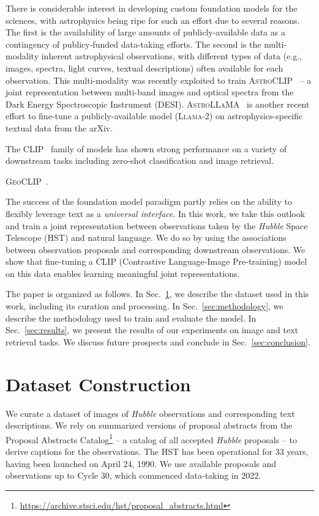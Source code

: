 \documentclass[10pt]{article} %
\newcommand{\hubble}{\emph{Hubble}\xspace}
\begin{document}
There is considerable interest in developing custom foundation models for the sciences, with astrophysics being ripe for such an effort due to several reasons. The first is the availability of large amounts of publicly-available data as a contingency of publicy-funded data-taking efforts. The second is the multi-modality inherent astrophysical observations, with different types of data (e.g., images, spectra, light curves, textual descriptions) often available for each observation. This multi-modality was recently exploited to train \textsc{AstroCLIP}~\citep{lanusse2023astroclip} -- a joint representation between multi-band images and optical spectra from the Dark Energy Spectroscopic Instrument (DESI). \textsc{AstroLLaMA}~\citep{nguyen2023astrollama} is another recent effort to fine-tune a publicly-available model (\textsc{Llama-2}) on astrophysics-specific textual data from the arXiv.

The CLIP~\citep{radford2021learning} family of models has shown strong performance on a variety of downstream tasks including zero-shot classification and image retrieval.

\textsc{GeoCLIP}~\citep{cepeda2023geoclip}.

The success of the foundation model paradigm partly relies on the ability to flexibly leverage text as a \emph{universal interface}. In this work, we take this outlook and train a joint representation between observations taken by the \hubble Space Telescope (HST) and natural language. We do so by using the associations between observation proposals and corresponding downstream observations. We show that fine-tuning a CLIP (Contrastive Language-Image Pre-training) model on this data enables learning meaningful joint representations.

The paper is organized as follows. In Sec.~\ref{sec:dataset}, we describe the dataset used in this work, including its curation and processing. In Sec.~\ref{sec:methodology}, we describe the methodology used to train and evaluate the model. In Sec.~\ref{sec:results}, we present the results of our experiments on image and text retrieval tasks. We discuss future prospects and conclude in Sec.~\ref{sec:conclusion}.

\section{Dataset Construction}
\label{sec:dataset}

We curate a dataset of images of \hubble observations and corresponding text descriptions. We rely on summarized versions of proposal abstracts from the Proposal Abstracts Catalog\footnote{\url{https://archive.stsci.edu/hst/proposal_abstracts.html}} -- a catalog of all accepted \hubble proposals -- to derive captions for the observations. The HST has been operational for 33 years, having been launched on April 24, 1990. We use available proposals and observations up to Cycle 30, which commenced data-taking in 2022. 
\end{document}
